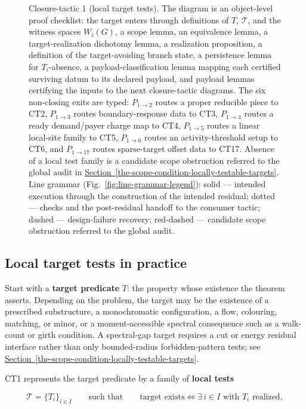 \documentclass[
  11pt,
]{article}
\theoremstyle{definition}
\newcommand{\secref}[1]{\hyperref[#1]{Section~\ref*{#1}}}
\begin{document}
\begin{figure}[p]
\caption[Closure-tactic 1: local target tests]{Closure-tactic 1 (local target tests).  The diagram is an object-level proof checklist: the target enters through definitions of \(T\), \(\mathcal T\), and the witness spaces \(W_i(G)\), a scope lemma, an equivalence lemma, a target-realization dichotomy lemma, a realization proposition, a definition of the target-avoiding branch state, a persistence lemma for \(T_i\)-absence, a payload-classification lemma mapping each certified surviving datum to its declared payload, and payload lemmas certifying the inputs to the next closure-tactic diagrams.  The six non-closing exits are typed: \(P_{1\to2}\) routes a proper reducible piece to CT2, \(P_{1\to3}\) routes boundary-response data to CT3, \(P_{1\to4}\) routes a ready demand/payer charge map to CT4, \(P_{1\to5}\) routes a linear local-site family to CT5, \(P_{1\to6}\) routes an activity-threshold setup to CT6, and \(P_{1\to17}\) routes sparse-target offset data to CT17.  Absence of a local test family is a candidate scope obstruction referred to the global audit in \secref{the-scope-condition-locally-testable-targets}.  Line grammar (Fig.~\ref{fig:line-grammar-legend}): solid --- intended execution through the construction of the intended residual; dotted --- checks and the post-residual handoff to the consumer tactic; dashed --- design-failure recovery; red-dashed --- candidate scope obstruction referred to the global audit.}
\label{fig:ct1-local-target-tests}
\end{figure}
\FloatBarrier

\subsection*{Local target tests in practice}

Start with a \textbf{target predicate} \(T\): the property whose
existence the theorem asserts. Depending on the problem, the target may
be the existence of a prescribed substructure, a monochromatic
configuration, a flow, colouring, matching, or minor, or a
moment-accessible spectral consequence such as a walk-count or girth
condition. A spectral-gap target requires a cut or energy residual
interface rather than only bounded-radius forbidden-pattern tests; see
\secref{the-scope-condition-locally-testable-targets}.

CT1 represents the target predicate by a family of
\textbf{local tests}

\[
\mathcal T = \{T_i\}_{i\in I}
\qquad\text{such that}\qquad
\text{target exists} \iff \exists\, i \in I \text{ with } T_i \text{ realized},
\]
\end{document}
